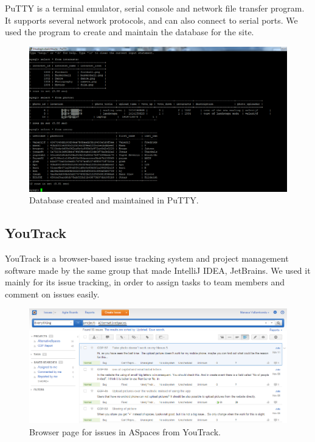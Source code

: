 PuTTY is a terminal emulator, serial console and network file transfer program. It supports several network protocols, and can also connect to serial ports. We used the program to create and maintain the database for the site.

\begin{figure}
  \centering
  \includegraphics[width=\linewidth]{./Planning/img/puttydb}
  \caption{Database created and maintained in PuTTY.}
  \label{fig:PlanningSoftwareDevPutty}
\end{figure}

\subsection{YouTrack}
\label{subsec:PlanningSoftwareDevYouTrack}
YouTrack is a browser-based issue tracking system and project management software made by the same group that made IntelliJ IDEA, JetBrains. We used it mainly for its issue tracking, in order to assign tasks to team members and comment on issues easily.

\begin{figure}[ht!]
  \centering
  \includegraphics[width=\linewidth]{./Planning/img/YouTrackPage}
  \caption{Browser page for issues in ASpaces from YouTrack.}
  \label{fig:PlanningSoftwareDevYouTrack}
\end{figure}